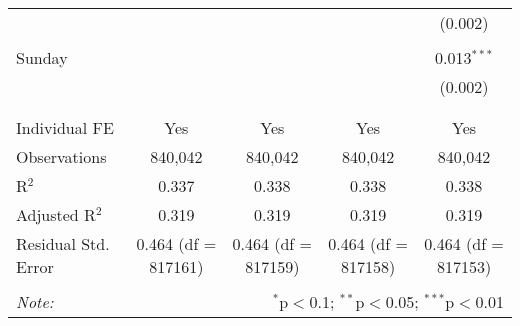 \documentclass[
]{article}
\begin{document}
\begin{table}[!htbp]
{\begin{tabular}{@{\extracolsep{5pt}}lcccc}
  &  &  &  & (0.002) \\ 
  & & & & \\ 
 Sunday &  &  &  & 0.013$^{***}$ \\ 
  &  &  &  & (0.002) \\ 
  & & & & \\ 
\hline \\[-1.8ex] 
Individual FE & Yes & Yes & Yes & Yes \\ 
Observations & 840,042 & 840,042 & 840,042 & 840,042 \\ 
R$^{2}$ & 0.337 & 0.338 & 0.338 & 0.338 \\ 
Adjusted R$^{2}$ & 0.319 & 0.319 & 0.319 & 0.319 \\ 
Residual Std. Error & 0.464 (df = 817161) & 0.464 (df = 817159) & 0.464 (df = 817158) & 0.464 (df = 817153) \\ 
\hline 
\hline \\[-1.8ex] 
\textit{Note:}  & \multicolumn{4}{r}{$^{*}$p$<$0.1; $^{**}$p$<$0.05; $^{***}$p$<$0.01} \\ 
\end{tabular}
} 
\end{table} 
\newpage
\end{document}
